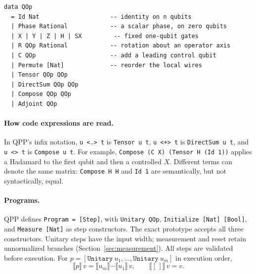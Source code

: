 \documentclass[11pt,a4paper]{article}
\newcommand{\sem}[1]{\llbracket #1\rrbracket}
\newcommand{\code}[1]{\texttt{#1}}
\begin{document}
\begin{minipage}{\linewidth}
\begin{lstlisting}
data QOp
  = Id Nat                    -- identity on n qubits
  | Phase Rational            -- a scalar phase, on zero qubits
  | X | Y | Z | H | SX         -- fixed one-qubit gates
  | R QOp Rational            -- rotation about an operator axis
  | C QOp                     -- add a leading control qubit
  | Permute [Nat]             -- reorder the local wires
  | Tensor QOp QOp
  | DirectSum QOp QOp
  | Compose QOp QOp
  | Adjoint QOp
\end{lstlisting}
\end{minipage}

\paragraph{How code expressions are read.}
In QPP's infix notation, \code{u <.> t} is \code{Tensor u t},
\code{u <+> t} is \code{DirectSum u t}, and \code{u <> t} is
\code{Compose u t}.
For example, \code{Compose (C X) (Tensor H (Id 1))} applies a Hadamard
to the first qubit and then a controlled $X$.
Different terms can denote the same matrix: \code{Compose H H} and
\code{Id 1} are semantically, but not syntactically, equal.

\paragraph{Programs.}
QPP defines \code{Program = [Step]}, with \code{Unitary QOp},
\code{Initialize [Nat] [Bool]}, and \code{Measure [Nat]} as step constructors.
The exact prototype accepts all three constructors. Unitary steps have the
input width; measurement and reset retain unnormalized branches
(Section~\ref{sec:measurement}). All steps are validated before execution.
For $p=[\code{Unitary}\ u_1,\ldots,\code{Unitary}\ u_m]$ in execution order,
\[
\sem p\,v=\sem{u_m}\cdots\sem{u_1}\,v,\qquad \sem{[\,]}\,v=v.
\]
\end{document}
